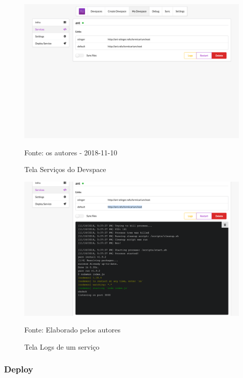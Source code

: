 \documentclass[twosideprint]{politex}
\newcommand{\legend}[1]{\begin{center}\def\caption{}\caption{#1}\end{center}}
\begin{document}
\begin{figure}[htb]
	\caption{\label{fig_frontend_devspace_services}Tela Serviços do Devspace}
	\begin{center}
	\includegraphics[width=\textwidth,keepaspectratio]{pictures/frontend/frontend-devspace-services.png}
	\end{center}
	\legend{Fonte: os autores - 2018-11-10}
\end{figure}

\begin{figure}[htb]
	\caption{\label{fig_frontend_logs}Tela Logs de um serviço}
	\begin{center}
	\includegraphics[width=\textwidth,keepaspectratio]{pictures/frontend/frontend-logs.png}
	\end{center}
	\legend{Fonte: Elaborado pelos autores}
\end{figure}

\subsubsection{Deploy}
\end{document}
